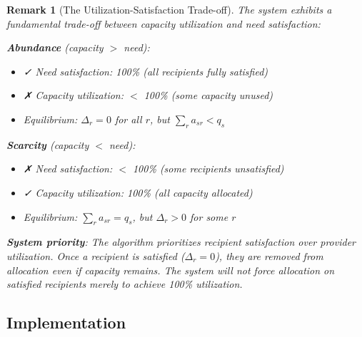 \documentclass[11pt]{article}
\newtheorem{remark}{Remark}
\begin{document}
\begin{remark}[The Utilization-Satisfaction Trade-off]
The system exhibits a fundamental trade-off between capacity utilization and need satisfaction:

\textbf{Abundance} (capacity $>$ need):
\begin{itemize}
\item ✓ Need satisfaction: 100\% (all recipients fully satisfied)
\item ✗ Capacity utilization: $<$ 100\% (some capacity unused)
\item Equilibrium: $\Delta_r = 0$ for all $r$, but $\sum_r a_{sr} < q_s$
\end{itemize}

\textbf{Scarcity} (capacity $<$ need):
\begin{itemize}
\item ✗ Need satisfaction: $<$ 100\% (some recipients unsatisfied)
\item ✓ Capacity utilization: 100\% (all capacity allocated)
\item Equilibrium: $\sum_r a_{sr} = q_s$, but $\Delta_r > 0$ for some $r$
\end{itemize}

\textbf{System priority}: The algorithm prioritizes recipient satisfaction over provider utilization. Once a recipient is satisfied ($\Delta_r = 0$), they are removed from allocation even if capacity remains. The system will not force allocation on satisfied recipients merely to achieve 100\% utilization.
\end{remark}

\subsection{Implementation}
\end{document}
